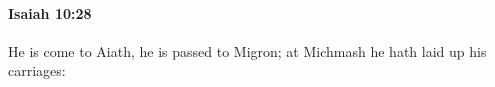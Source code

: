 
		\paragraph{Isaiah 10:28} %
			\label{ISAIAH-10-28}

			He is come to Aiath, he is passed to Migron; at Michmash he hath laid up his carriages:


